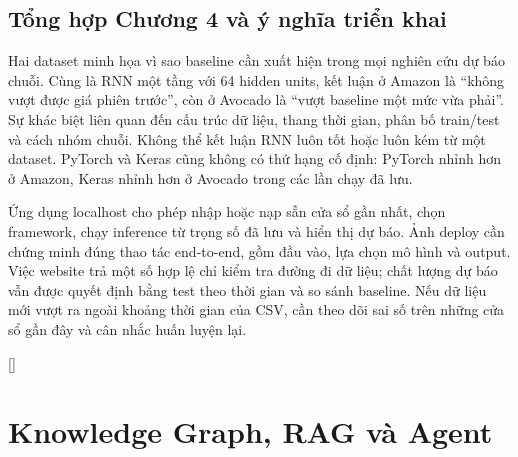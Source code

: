 \documentclass[12pt,a4paper]{report}
\begin{document}
\section{Tổng hợp Chương 4 và ý nghĩa triển khai}
Hai dataset minh họa vì sao baseline cần xuất hiện trong mọi nghiên cứu dự báo chuỗi. Cùng là RNN một tầng với 64 hidden units, kết luận ở Amazon là ``không vượt được giá phiên trước'', còn ở Avocado là ``vượt baseline một mức vừa phải''. Sự khác biệt liên quan đến cấu trúc dữ liệu, thang thời gian, phân bố train/test và cách nhóm chuỗi. Không thể kết luận RNN luôn tốt hoặc luôn kém từ một dataset. PyTorch và Keras cũng không có thứ hạng cố định: PyTorch nhỉnh hơn ở Amazon, Keras nhỉnh hơn ở Avocado trong các lần chạy đã lưu.

Ứng dụng localhost cho phép nhập hoặc nạp sẵn cửa sổ gần nhất, chọn framework, chạy inference từ trọng số đã lưu và hiển thị dự báo. Ảnh deploy cần chứng minh đúng thao tác end-to-end, gồm đầu vào, lựa chọn mô hình và output. Việc website trả một số hợp lệ chỉ kiểm tra đường đi dữ liệu; chất lượng dự báo vẫn được quyết định bằng test theo thời gian và so sánh baseline. Nếu dữ liệu mới vượt ra ngoài khoảng thời gian của CSV, cần theo dõi sai số trên những cửa sổ gần đây và cân nhắc huấn luyện lại.


\clearpage
\begingroup
\color{red}
\titleformat{\chapter}[display]{\normalfont\bfseries\color{red}}{\filleft\Large\chaptertitlename\ \thechapter}{1ex}{\titlerule\vspace{1ex}\filright\LARGE}[\vspace{1ex}\titlerule]
\titleformat{\section}{\normalfont\Large\bfseries\color{red}}{\thesection}{1em}{}
\titleformat{\subsection}{\normalfont\large\bfseries\color{red}}{\thesubsection}{1em}{}
\hypersetup{linkcolor=red,urlcolor=red,citecolor=red}

\chapter{Knowledge Graph, RAG và Agent}\label{ch:kb-rag}
\end{document}
